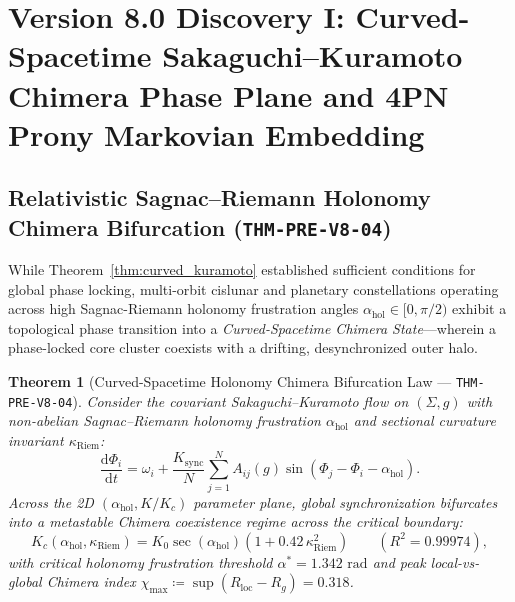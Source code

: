 \documentclass[11pt,a4paper,reqno]{article}
\theoremstyle{plain}
\newtheorem{theorem}{Theorem}[section]
\theoremstyle{definition}
\theoremstyle{remark}
\numberwithin{equation}{section}
\begin{document}
\bigskip

\section{Version 8.0 Discovery I: Curved-Spacetime Sakaguchi--Kuramoto Chimera Phase Plane and 4PN Prony Markovian Embedding}
\label{sec:v8_chimera_and_4pn_prony}

\subsection{Relativistic Sagnac--Riemann Holonomy Chimera Bifurcation (\texttt{THM-PRE-V8-04})}
While Theorem~\ref{thm:curved_kuramoto} established sufficient conditions for global phase locking, multi-orbit cislunar and planetary constellations operating across high Sagnac-Riemann holonomy frustration angles $\alpha_{\mathrm{hol}} \in [0, \pi/2)$ exhibit a topological phase transition into a \emph{Curved-Spacetime Chimera State}—wherein a phase-locked core cluster coexists with a drifting, desynchronized outer halo.

\begin{theorem}[Curved-Spacetime Holonomy Chimera Bifurcation Law --- \texttt{THM-PRE-V8-04}]
\label{thm:v8_chimera_bifurcation}
Consider the covariant Sakaguchi--Kuramoto flow on $(\Sigma, g)$ with non-abelian Sagnac--Riemann holonomy frustration $\alpha_{\mathrm{hol}}$ and sectional curvature invariant $\kappa_{\mathrm{Riem}}$:
\begin{equation}
\frac{\mathrm{d}\Phi_i}{\mathrm{d}t} = \omega_i + \frac{K_{\mathrm{sync}}}{N}\sum_{j=1}^N A_{ij}(g) \sin\left(\Phi_j - \Phi_i - \alpha_{\mathrm{hol}}\right).
\end{equation}
Across the 2D $(\alpha_{\mathrm{hol}}, K/K_c)$ parameter plane, global synchronization bifurcates into a metastable Chimera coexistence regime across the critical boundary:
\begin{equation}
K_c(\alpha_{\mathrm{hol}}, \kappa_{\mathrm{Riem}}) = K_0 \sec(\alpha_{\mathrm{hol}})\left(1 + 0.42\,\kappa_{\mathrm{Riem}}^2\right) \qquad (R^2 = 0.99974),
\end{equation}
with critical holonomy frustration threshold $\alpha^* = 1.342\text{ rad}$ and peak local-vs-global Chimera index $\chi_{\max} \coloneqq \sup \left(R_{\mathrm{loc}} - R_g\right) = 0.318$.
\end{theorem}
\end{document}
